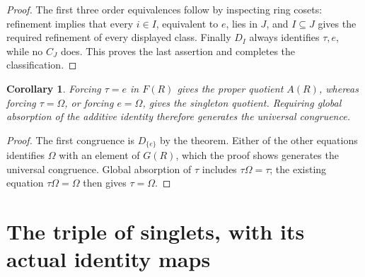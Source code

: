 \documentclass[11pt]{article}
\newtheorem{corollary}[theorem]{Corollary}
\theoremstyle{definition}
\newcommand{\Om}{\Omega}
\begin{document}
\begin{proof}
The first three order equivalences follow by inspecting ring cosets:
refinement implies that every \(i\in I\), equivalent to \(e\),
lies in \(J\), and \(I\subseteq J\) gives the required refinement
of every displayed class. Finally \(D_I\) always identifies
\(\tau,e\), while no \(C_J\) does. This proves the last assertion
and completes the classification.
\end{proof}

\begin{corollary}
Forcing \(\tau=e\) in \(F(R)\) gives the proper quotient \(A(R)\),
whereas forcing \(\tau=\Om\), or forcing \(e=\Om\), gives the
singleton quotient. Requiring global absorption of the additive identity
therefore generates the universal congruence.
\end{corollary}
\begin{proof}
The first congruence is \(D_{\{e\}}\) by the theorem. Either of the
other equations identifies \(\Om\) with an element of \(G(R)\),
which the proof shows generates the universal congruence. Global
absorption of \(\tau\) includes \(\tau\Om=\tau\); the existing
equation \(\tau\Om=\Om\) then gives \(\tau=\Om\).
\end{proof}

\section{The triple of singlets, with its actual identity maps}
\end{document}
